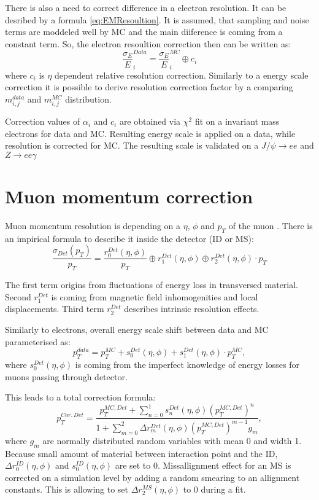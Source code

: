 There is also a need to correct difference in a electron resolution. It can be desribed by a formula \ref{eq:EMResoultion}. It is assumed, that sampling and noise terms are moddeled well by MC and the main diiference is coming from a constant term. 
So, the electron resoultion correction then can be written as:
\begin{equation}
\frac{\sigma_E}{E}^{Data}_{i}=\frac{\sigma_E}{E}^{MC}_{i} \oplus c_i
\end{equation}
where $c_i$ is $\eta$ dependent relative resolution correction. Similarly to a energy scale correction it is possible to derive resolution correction factor by a comparing $m_{i,j}^{data}$ and $m_{i,j}^{MC}$ distribution. 

Correction values of $\alpha_i$ and $c_i$ are obtained via $\chi^2$ fit on a invariant mass electrons for data and MC. Resulting energy scale is applied on a data, while resolution is corrected for MC. The resulting scale is validated on a $J/\psi \to ee$ and $Z\to ee \gamma$

\section{Muon momentum correction}
Muon momentum resolution is depending on a $\eta$, $\phi$ and $p_T$ of the muon \cite{AtlasExperiment}. There is an impirical formula to describe it inside the detector (ID or MS):
\begin{equation}\label{eq:MuonResolution}
\frac{\sigma_{Det}(p_T)}{p_T}=\frac{r^{Det}_0(\eta, \phi)}{p_T} \oplus r^{Det}_1 (\eta, \phi)  \oplus r^{Det}_2(\eta, \phi) \cdot p_T
\end{equation}

The first term origins from fluctuations of energy loss in transversed material. Second $r^{Det}_1$ is coming from magnetic field inhomogenities and local displacements. Third term $r^{Det}_2$ describes intrinsic resolution effects. 

Similarly to electrons, overall energy scale shift between data and MC parameterised as:
\begin{equation}
p_T^{data}=p_T^{MC}+s_0^{Det}(\eta, \phi)+s_1^{Det}(\eta, \phi) \cdot p_T^{MC},
\end{equation}
where $s_0^{Det}(\eta, \phi)$ is coming from the imperfect knowledge of energy losses for muons passing through detector. 

This leads to a total correction formula:
\begin{equation}
p^{Cor,Det}_T=\frac{p_{T}^{MC,Det}+\sum\limits_{n=0}^1 s_n^{Det}(\eta, \phi)(p_T^{MC,Det})^n}{1+\sum\limits_{m=0}^2 \Delta r_m^{Det}(\eta, \phi)(p_T^{MC,Det})^{m-1} g_m},
\end{equation}
where $g_m$ are normally distributed random variables with mean 0 and width 1. Because small amount of material between interaction point and the ID, $\Delta r^{ID}_0(\eta, \phi)$ and $s_0^{ID}(\eta, \phi)$ are set to 0. Missallignment effect for an MS is corrected on a simulation level by adding a random smearing to an allignment constants. This is allowing to set $\Delta r^{MS}_2(\eta, \phi)$ to 0 during a fit. 

